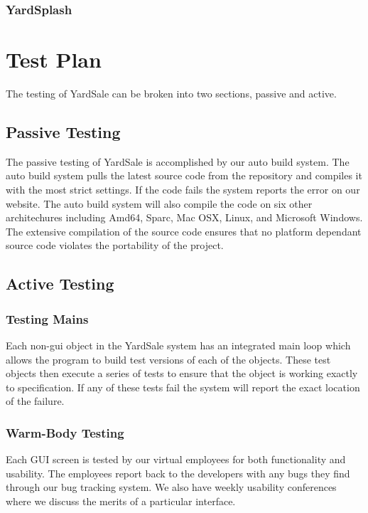 \documentclass{report}
\begin{document}
    \subsection{YardSplash}

\chapter{Test Plan}

The testing of YardSale can be broken into two sections, passive and active.

\section{Passive Testing}

The passive testing of YardSale is accomplished by our auto build system.  The auto build system pulls the latest source
code from the repository and compiles it with the most strict settings.  If the code fails the system reports the error
on our website.  The auto build system will also compile the code on six other architechures including Amd64, Sparc, Mac OSX,
Linux, and Microsoft Windows.  The extensive compilation of the source code ensures that no platform dependant source code
violates the portability of the project.

\section{Active Testing}

\subsection{Testing Mains}
Each non-gui object in the YardSale system has an integrated main loop which allows the program to build test versions of
each of the objects.  These test objects then execute a series of tests to ensure that the object is working exactly to specification.
If any of these tests fail the system will report the exact location of the failure.

\subsection{Warm-Body Testing}
Each GUI screen is tested by our virtual employees for both functionality and usability.  The employees report back to the developers with any
bugs they find through our bug tracking system.  We also have weekly usability conferences where we discuss the merits of a particular interface.
\end{document}
